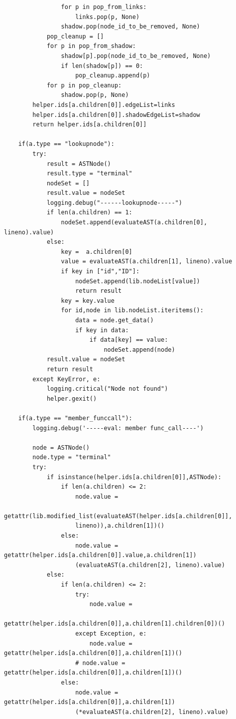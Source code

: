\documentclass[a4paper]{article}
\begin{document}
\begin{verbatim}
                for p in pop_from_links:
                    links.pop(p, None)
                shadow.pop(node_id_to_be_removed, None)
            pop_cleanup = []
            for p in pop_from_shadow:
                shadow[p].pop(node_id_to_be_removed, None)
                if len(shadow[p]) == 0:
                    pop_cleanup.append(p)
            for p in pop_cleanup:
                shadow.pop(p, None)
        helper.ids[a.children[0]].edgeList=links
        helper.ids[a.children[0]].shadowEdgeList=shadow
        return helper.ids[a.children[0]]

    if(a.type == "lookupnode"):
        try:
            result = ASTNode()
            result.type = "terminal"
            nodeSet = []
            result.value = nodeSet
            logging.debug("------lookupnode-----")
            if len(a.children) == 1:
                nodeSet.append(evaluateAST(a.children[0], lineno).value)
            else:
                key =  a.children[0]
                value = evaluateAST(a.children[1], lineno).value
                if key in ["id","ID"]:
                    nodeSet.append(lib.nodeList[value])
                    return result
                key = key.value
                for id,node in lib.nodeList.iteritems():
                    data = node.get_data()
                    if key in data: 
                        if data[key] == value:
                            nodeSet.append(node)
            result.value = nodeSet
            return result
        except KeyError, e:
            logging.critical("Node not found")
            helper.gexit()

    if(a.type == "member_funccall"):
        logging.debug('-----eval: member func_call----')
        
        node = ASTNode()
        node.type = "terminal"
        try:
            if isinstance(helper.ids[a.children[0]],ASTNode):
                if len(a.children) <= 2:
                    node.value = 
                    getattr(lib.modified_list(evaluateAST(helper.ids[a.children[0]], 
                    lineno)),a.children[1])()
                else: 
                    node.value = getattr(helper.ids[a.children[0]].value,a.children[1])
                    (evaluateAST(a.children[2], lineno).value)
            else:
                if len(a.children) <= 2:
                    try:
                        node.value = 
                        getattr(helper.ids[a.children[0]],a.children[1].children[0])()
                    except Exception, e:
                        node.value = getattr(helper.ids[a.children[0]],a.children[1])()
                    # node.value = getattr(helper.ids[a.children[0]],a.children[1])()
                else:
                    node.value = getattr(helper.ids[a.children[0]],a.children[1])
                    (*evaluateAST(a.children[2], lineno).value)


\end{verbatim}
\end{document}
